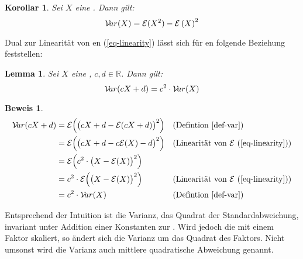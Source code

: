 \documentclass[a4paper]{article}
\newtheorem{korollar}[satz]{Korollar}
\newtheorem{lemma}[satz]{Lemma}
\theoremstyle{nonumberplain}
\newtheorem{beweis}{Beweis}
\begin{document}
\begin{korollar}\label{kor-var-exp}
	Sei $X$ eine \rvar{}. Dann gilt:
	\begin{equation}
		\mathcal{V}\!ar(X) = \mathcal{E}(X^{2}) - \mathcal{E}\left(X\right)^{2}
	\end{equation}
\end{korollar}
Dual zur Linearität von \expect{}en (\ref{eq-linearity}) lässt sich für \var{}en folgende Beziehung feststellen:
\begin{lemma}\label{lemma-var-qlinear}
	Sei $X$ eine \rvar{}, $c,d \in \mathbb{R}$. Dann gilt:
	\begin{equation}
		\mathcal{V}\!ar(cX + d) = c^2\cdot\mathcal{V}\!ar(X)
	\end{equation}
\end{lemma}
\begin{beweis}
\begin{align*}
\mathcal{V}\!ar(cX + d) & = \mathcal{E}\Big(\big(cX + d - \mathcal{E}(cX + d)\big)^2\Big) && \text{(Defintion \ref{def-var})} \\
& = \mathcal{E}\Big(\big(cX + d - c\mathcal{E}(X) - d\big)^2\Big) && \text{(Linearität von $\mathcal{E}$ (\ref{eq-linearity}))}\\
& = \mathcal{E}\Big(c^2 \cdot \big(X - \mathcal{E}(X) \big)^2\Big)\\
& = c^2 \cdot \mathcal{E}\Big( \big(X - \mathcal{E}(X) \big)^2\Big) && \text{(Linearität von $\mathcal{E}$ (\ref{eq-linearity}))}\\
& = c^2 \cdot \mathcal{V}\!ar(X) && \text{(Defintion \ref{def-var})}
\end{align*}
\end{beweis}
Entsprechend der Intuition ist die Varianz, das Quadrat der Standardabweichung, invariant unter Addition einer Konstanten zur \rvar{}. Wird jedoch die \rvar{} mit einem Faktor skaliert, so ändert sich die Varianz um das Quadrat des Faktors. Nicht umsonst wird die Varianz auch mittlere quadratische Abweichung genannt.
\end{document}

